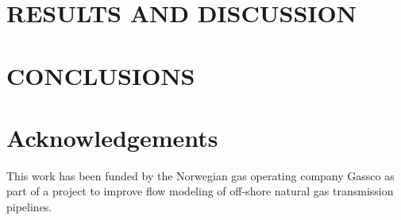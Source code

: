 \documentclass{mekit17}
\begin{document}
\section{RESULTS AND DISCUSSION}
\label{results}


\section{CONCLUSIONS}
\label{conclusion}


\section*{Acknowledgements}
This work has been funded by the Norwegian gas operating company Gassco as part of a project to improve flow modeling of off-shore natural gas transmission pipelines. 

\printbibliography
\end{document}
